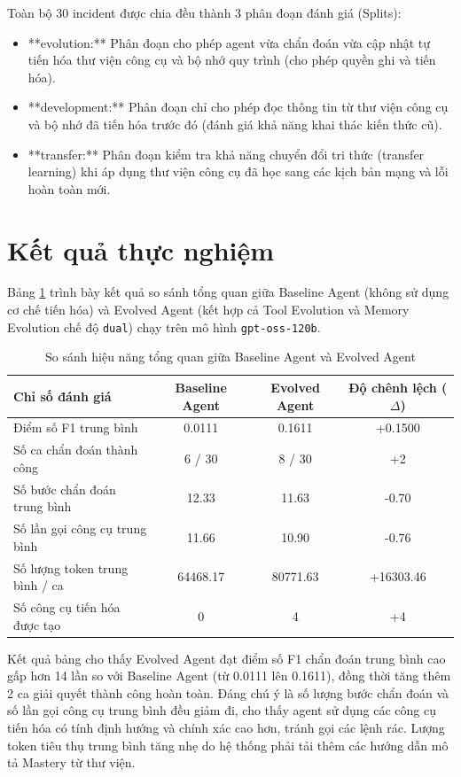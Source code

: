 Toàn bộ 30 incident được chia đều thành 3 phân đoạn đánh giá (Splits):
\begin{itemize}
    \item **evolution:** Phân đoạn cho phép agent vừa chẩn đoán vừa cập nhật tự tiến hóa thư viện công cụ và bộ nhớ quy trình (cho phép quyền ghi và tiến hóa).
    \item **development:** Phân đoạn chỉ cho phép đọc thông tin từ thư viện công cụ và bộ nhớ đã tiến hóa trước đó (đánh giá khả năng khai thác kiến thức cũ).
    \item **transfer:** Phân đoạn kiểm tra khả năng chuyển đổi tri thức (transfer learning) khi áp dụng thư viện công cụ đã học sang các kịch bản mạng và lỗi hoàn toàn mới.
\end{itemize}

\section{Kết quả thực nghiệm}
\label{sec:experimental_results}

Bảng \ref{tab:overall_results} trình bày kết quả so sánh tổng quan giữa Baseline Agent (không sử dụng cơ chế tiến hóa) và Evolved Agent (kết hợp cả Tool Evolution và Memory Evolution chế độ \texttt{dual}) chạy trên mô hình \texttt{gpt-oss-120b}.

\begin{table}[htbp]
\centering
\caption{So sánh hiệu năng tổng quan giữa Baseline Agent và Evolved Agent}
\label{tab:overall_results}
\begin{tabular}{|l|c|c|c|}
\hline
\textbf{Chỉ số đánh giá} & \textbf{Baseline Agent} & \textbf{Evolved Agent} & \textbf{Độ chênh lệch ($\Delta$)} \\ \hline
Điểm số F1 trung bình & 0.0111 & 0.1611 & +0.1500 \\ \hline
Số ca chẩn đoán thành công & 6 / 30 & 8 / 30 & +2 \\ \hline
Số bước chẩn đoán trung bình & 12.33 & 11.63 & -0.70 \\ \hline
Số lần gọi công cụ trung bình & 11.66 & 10.90 & -0.76 \\ \hline
Số lượng token trung bình / ca & 64468.17 & 80771.63 & +16303.46 \\ \hline
Số công cụ tiến hóa được tạo & 0 & 4 & +4 \\ \hline
\end{tabular}
\end{table}

Kết quả bảng cho thấy Evolved Agent đạt điểm số F1 chẩn đoán trung bình cao gấp hơn 14 lần so với Baseline Agent (từ 0.0111 lên 0.1611), đồng thời tăng thêm 2 ca giải quyết thành công hoàn toàn. Đáng chú ý là số lượng bước chẩn đoán và số lần gọi công cụ trung bình đều giảm đi, cho thấy agent sử dụng các công cụ tiến hóa có tính định hướng và chính xác cao hơn, tránh gọi các lệnh rác. Lượng token tiêu thụ trung bình tăng nhẹ do hệ thống phải tải thêm các hướng dẫn mô tả Mastery từ thư viện.

